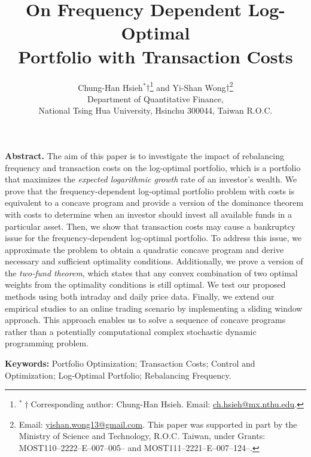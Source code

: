 \documentclass[10pt]{article} %
\begin{document}
	
	
	\title{On Frequency Dependent Log-Optimal \\ Portfolio with Transaction Costs}
\date{}
	\author{Chung-Han Hsieh$^{\ast}$$\dag$\thanks{$^\ast \dag$Corresponding author: Chung-Han Hsieh.
			Email: \href{mailto: ch.hsieh@mx.nthu.edu}{ch.hsieh@mx.nthu.edu}. } and Yi-Shan Wong${\dag}$\thanks{\dag Email: \href{mailto: yishan.wong13@gmail.com}{yishan.wong13@gmail.com}. This paper was supported in part by the Ministry of Science and Technology, R.O.C. Taiwan, under Grants: MOST110--2222--E--007--005-- and MOST111--2221--E--007--124--.}\\
 Department of Quantitative Finance, \\National Tsing Hua University, Hsinchu 300044, Taiwan R.O.C.
	}
	
	\maketitle
	
\textbf{Abstract.}
		The aim of this paper is to investigate the impact of rebalancing frequency and transaction costs on the log-optimal portfolio, which is a portfolio that maximizes the \textit{expected logarithmic growth} rate of an investor's wealth.
		We prove that the frequency-dependent log-optimal portfolio problem with costs is equivalent to a concave program and provide a version of the dominance theorem with costs to determine when an  investor should invest all available funds in a particular asset. 
		Then, we show that transaction costs may cause a bankruptcy issue for the frequency-dependent log-optimal portfolio.
		To address this issue,  we approximate the problem to obtain a quadratic concave program and derive necessary and sufficient optimality conditions. 
		Additionally, we prove a version of the \textit{two-fund theorem}, which states that any convex combination of two optimal weights from the optimality conditions is still optimal.
		We test our proposed methods using both intraday and daily price data.
		Finally, we extend our empirical studies to an online trading scenario by implementing a sliding window approach. This approach enables us to solve a sequence of concave programs rather than a potentially computational complex stochastic dynamic programming problem.

	\vspace{5mm}
\textbf{Keywords:}
		Portfolio Optimization; Transaction Costs; Control and Optimization; Log-Optimal Portfolio; Rebalancing Frequency. 
\end{document}
